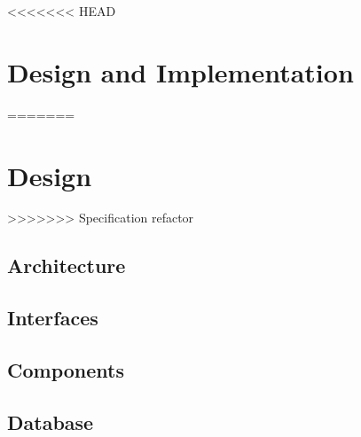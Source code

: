 <<<<<<< HEAD
\chapter{Design and Implementation}\label{part:design}
=======
\chapter{Design}\label{part:design}
>>>>>>> Specification refactor

\section{Architecture}
 
\section{Interfaces}
 
\section{Components}
 
\section{Database}
